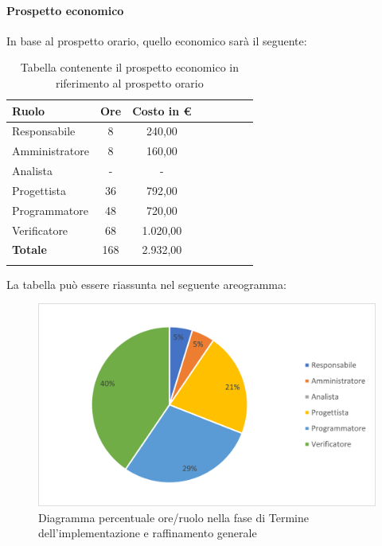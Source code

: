 \paragraph{Prospetto economico}
In base al prospetto orario, quello economico sarà il seguente:

\begin{longtable}{|l|c|c|c|c|c|c|c|}
	\hline
	\rowcolor{lighter-grayer}
	\textbf{Ruolo}  & \textbf{Ore} & \textbf{Costo in €} \\
	\hline
	\endfirsthead

	\hline
	Responsabile    & 8            & 240,00              \\
	\hline
	\hline
	Amministratore  & 8            & 160,00              \\
	\hline
	\hline
	Analista        & -            & -                   \\
	\hline
	\hline
	Progettista     & 36           & 792,00              \\
	\hline
	\hline
	Programmatore   & 48           & 720,00              \\
	\hline
	\hline
	Verificatore    & 68           & 1.020,00            \\
	\hline
	\hline
	\textbf{Totale} & 168          & 2.932,00            \\
	\hline
	\rowcolor{white}
	\caption{Tabella contenente il prospetto economico in riferimento al prospetto orario}
\end{longtable}
\pagebreak

La tabella può essere riassunta nel seguente areogramma:
\begin{figure}[H]
	\centering
	\includegraphics[width=0.8\linewidth]{res/images/preventivo/6-2.png}
	\caption{Diagramma percentuale ore/ruolo nella fase di Termine dell'implementazione e raffinamento generale}
	\label{fig:diagramma costi ruolo fase Termine dell'implementazione e raffinamento generale}
\end{figure}


